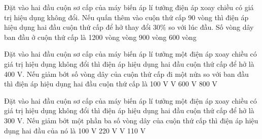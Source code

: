 \begin{vidu} %
	Đặt vào hai đầu cuộn sơ cấp của máy biến áp lí tưởng điện áp xoay chiều có giá trị hiệu dụng không đổi. Nếu quấn thêm vào cuộn thứ cấp 90 vòng thì điện áp hiệu dụng hai đầu cuộn thứ cấp để hở thay đổi $30\%$ so với lúc đầu. Số vòng dây ban đầu ở cuộn thứ cấp là
	\choice
	{1200 vòng}
	{ vòng}
	{900 vòng}
	{600 vòng}
\end{vidu}
\begin{vidu} %
	Đặt vào hai đầu cuộn sơ cấp của máy biến áp lí tưởng một điện áp xoay chiều có giá trị hiệu dụng không đổi thì điện áp hiệu dụng hai đầu cuộn thứ cấp để hở là 400 V. Nếu giảm bớt số vòng dây của cuộn thứ cấp đi một nửa so với ban đầu thì điện áp hiệu dụng hai đầu cuộn thứ cấp là
	\choice
	{100 V}
	{ V}
	{600 V}
	{800 V}
\end{vidu}
\begin{vidu} %
	Đặt vào hai đầu cuộn sơ cấp của máy biến áp lí tưởng một điện áp xoay chiều có giá trị hiệu dụng không đổi thì điện áp hiệu dụng hai đầu cuộn thứ cấp để hở là 300 V. Nếu giảm bớt một phần ba số vòng dây của cuộn thứ cấp thì điện áp hiệu dụng hai đầu của nó là
	\choice
	{100 V}
	{220 V}
	{ V}
	{110 V}
\end{vidu}
